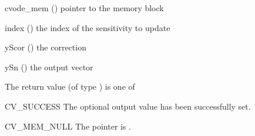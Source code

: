 {
  \begin{args}
    \item[cvode\_mem] () pointer to the {\cvodes} memory block
    \item[index] () the index of the sensitivity to update
    \item[yScor] () the correction
    \item[ySn] () the output vector
  \end{args}
}
{
  The return value  (of type ) is one of
  \begin{args}
  \item[CV\_SUCCESS]
    The optional output value has been successfully set.
  \item[CV\_MEM\_NULL]
    The  pointer is .
  \end{args}
}
{}






